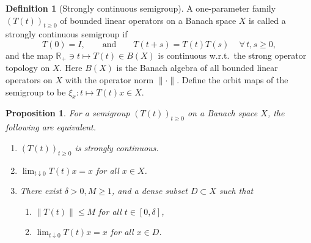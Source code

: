 \documentclass[11pt,a4paper]{article}
\theoremstyle{plain}
\numberwithin{theorem}{section}
\newtheorem{proposition}[theorem]{Proposition}
\theoremstyle{definition}
\newtheorem{definition}[theorem]{Definition}
\newcommand{\?}{\overset{?}{=}}
\newcommand{\A}{\,\forall\,}
\newcommand{\R}{\mathbb{R}}
\renewcommand{\d}{\delta}	%
\begin{document}
\begin{appendix}
\begin{definition}[Strongly continuous semigroup]
A one-parameter family $(T(t))_{t\geq0}$ of bounded linear operators on a Banach space $X$ is called a strongly continuous semigroup if
\begin{equation}
    T(0) = I, \qquad \text{and}\qquad T(t+s)=T(t)T(s)\quad\A t,s\geq0,
\end{equation}
and the map $\R_+\ni t\mapsto T(t)\in B(X)$
is continuous w.r.t.~the strong operator topology on $X$. 
Here $B(X)$ is the Banach algebra of all bounded linear operators on $X$ with the operator norm $\|\cdot\|$. Define the orbit maps of the semigroup to be $\xi_x:t\mapsto T(t)x\in X$.
\end{definition}
\begin{proposition}\label{prop:semigroup}
For a semigroup $(T(t))_{t\geq0}$ on a Banach space $X$, the following are equivalent.
\begin{enumerate}
    \item $(T(t))_{t\geq0}$ is strongly continuous.
    \item $\lim_{t\downarrow0}T(t)x=x$ for all $x\in X$.
    \item There exist $\d>0,M\geq 1$, and a dense subset $D\subset X$ such that
    \begin{enumerate}
        \item $\|T(t)\|\leq M$ for all $t\in[0,\d]$,
        \item $\lim_{t\downarrow0}T(t)x=x$ for all $x\in D$.
    \end{enumerate}
\end{enumerate}
\end{proposition}



\end{appendix}
\end{document}
